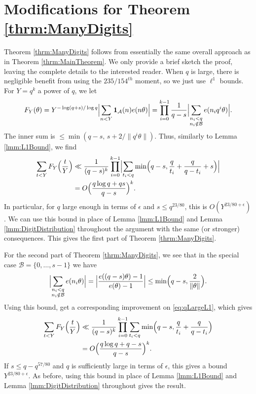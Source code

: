 \documentclass[10pt]{amsart}
\theoremstyle{plain}
\numberwithin{sblmm}{thrm}
\numberwithin{equation}{section}
\begin{document}
\section{Modifications for Theorem \ref{thrm:ManyDigits}}\label{sec:ManyPrimes}
%
%
%
%
%
Theorem \ref{thrm:ManyDigits} follows from essentially the same overall approach as in Theorem \ref{thrm:MainTheorem}. We only provide a brief sketch the proof, leaving the complete details to the interested reader. When $q$ is large, there is negligible benefit from using the $235/154^{th}$ moment, so we just use $\ell^1$ bounds. For $Y=q^k$ a power of $q$, we let
\[
F_Y(\theta)=Y^{-\log(q+s)/\log{q}}\Bigl|\sum_{n<Y}\mathbf{1}_\mathcal{A}(n)e(n\theta)\Bigr|=\prod_{i=0}^{k-1}\frac{1}{q-s}\Bigl|\sum_{\substack{n_i<q\\ n_i\notin\mathcal{B}}}e(n_i q^i\theta)\Bigr|.
\]
The inner sum is $\le \min(q-s,\,s+2/\|q^i\theta\|)$. Thus, similarly to Lemma \ref{lmm:L1Bound}, we find
\begin{align}
\sum_{t<Y}F_{Y}\Bigl(\frac{t}{Y}\Bigr)&\ll \frac{1}{(q-s)^k}\prod_{i=0}^{k-1}\Bigl|\sum_{t_i<q}\min\Bigl(q-s,\frac{q}{t_i}+\frac{q}{q-t_i}+s\Bigr)\Bigr|\nonumber\\
&= O\Bigl(\frac{q\log{q}+q s}{q-s}\Bigr)^k.\label{eq:qLargeL1}
\end{align}
In particular, for $q$ large enough in terms of $\epsilon$ and $s\le q^{23/80}$, this is $O(Y^{23/80+\epsilon})$. We can use this bound in place of Lemma \ref{lmm:L1Bound} and Lemma \ref{lmm:DigitDistribution} throughout the argument with the same (or stronger) consequences. This gives the first part of Theorem \ref{thrm:ManyDigits}.

For the second part of Theorem \ref{thrm:ManyDigits}, we see that in the special case $\mathcal{B}=\{0,\dots,s-1\}$ we have
\[
\Bigl|\sum_{\substack{n_i<q\\ n_i\notin\mathcal{B}}}e(n_i\theta)\Bigr|=\Bigl|\frac{e((q-s)\theta)-1}{e(\theta)-1}\Bigr|\le \min\Bigl(q-s, \frac{2}{\|\theta\|}\Bigr).
\]
Using this bound, get a corresponding improvement on \eqref{eq:qLargeL1}, which gives
\begin{align}
\sum_{t<Y}F_Y\Bigl(\frac{t}{Y}\Bigr)&\ll \frac{1}{(q-s)^k}\prod_{i=0}^{k-1}\sum_{t_i<q}\min\Bigl(q-s,\frac{q}{t_i}+\frac{q}{q-t_i}\Bigr)\nonumber\\
&=O\Bigl(\frac{q\log{q}+q-s}{q-s}\Bigr)^k.\label{eq:qLargeL12}
\end{align}
If $s\le q-q^{57/80}$ and $q$ is sufficiently large in terms of $\epsilon$, this gives a bound $Y^{23/80+\epsilon}$. As before, using this bound in place of Lemma \ref{lmm:L1Bound} and Lemma \ref{lmm:DigitDistribution} throughout gives the result.
\end{document}
